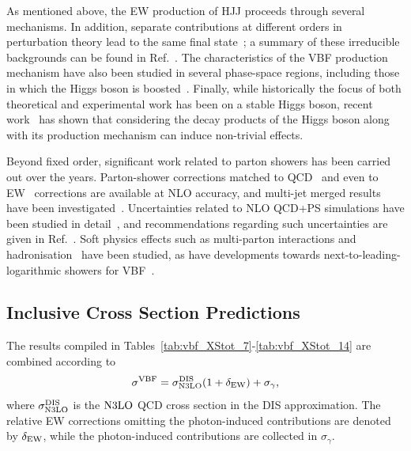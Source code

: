 As mentioned above, the EW production of HJJ proceeds through several
mechanisms. In addition, separate contributions at different orders in
perturbation theory lead to the same final
state~\cite{Andersen:2006ag,Andersen:2007mp,Harlander:2008xn,Greiner:2016awe,
Greiner:2015jha,Andersen:2017kfc,Andersen:2018tnm,Andersen:2018kjg,
Chen:2021azt,Andersen:2022zte}; a summary of these irreducible backgrounds can
be found in Ref.~\cite{Barone:2025jey}. The characteristics of the VBF
production mechanism have also been studied in several phase-space regions,
including those in which the Higgs boson is
boosted~\cite{Becker:2020rjp,Buckley:2021gfw}. Finally, while historically the
focus of both theoretical and experimental work has been on a stable Higgs
boson, recent work~\cite{Asteriadis:2021gpd,Asteriadis:2024nbg} has shown that
considering the decay products of the Higgs boson along with its production
mechanism can induce non-trivial effects.

Beyond fixed order, significant work related to parton showers has been carried
out over the years. Parton-shower corrections matched to
QCD~\cite{Nason:2009ai,Frixione:2013mta} and even to EW~\cite{Jager:2022acp}
corrections are available at NLO accuracy, and multi-jet merged results have
been investigated~\cite{Hoche:2021mkv,Chen:2021phj}. Uncertainties related to
NLO QCD+PS simulations have been studied in
detail~\cite{Jager:2020hkz,Buckley:2021gfw,Hoche:2021mkv}, and recommendations
regarding such uncertainties are given in Ref.~\cite{Barone:2025jey}. Soft
physics effects such as multi-parton interactions and
hadronisation~\cite{Hoche:2021mkv,Bittrich:2021ztq} have been studied, as have
developments towards next-to-leading-logarithmic showers for
VBF~\cite{vanBeekveld:2023chs}.

\subsection{Inclusive Cross Section Predictions}
\label{sec:vbf_xs}

The results compiled in Tables~\ref{tab:vbf_XStot_7}-\ref{tab:vbf_XStot_14} are
combined according to
\begin{align}
  \label{eq:vbf-xsec-combined}
  \sigma^{\mathrm{VBF}} = \sigma_{\mathrm{N3LO}}^{\mathrm{DIS}} (1+\delta_{\mathrm{EW}}) + \sigma_{\gamma} ,
\end{align}
%
where $\sigma_{\mathrm{N3LO}}^{\mathrm{DIS}}$ is the $\mathrm{N3LO}$ QCD cross section in the DIS
approximation. The relative EW corrections omitting the photon-induced
contributions are denoted by $\delta_{\mathrm{EW}}$, while the photon-induced
contributions are collected in $\sigma_{\gamma}$.

